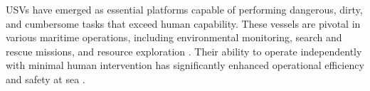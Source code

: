 \documentclass{erauthesis}
\begin{document}





\Acp{USV} have emerged as essential platforms capable of performing dangerous, dirty, and cumbersome tasks that exceed human capability. These vessels are pivotal in various maritime operations, including environmental monitoring, search and rescue missions, and resource exploration \cite{liebergall, eckstein2024}.%
Their ability to operate independently with minimal human intervention has significantly enhanced operational efficiency and safety at sea \cite{bai2022}.%
\end{document}
